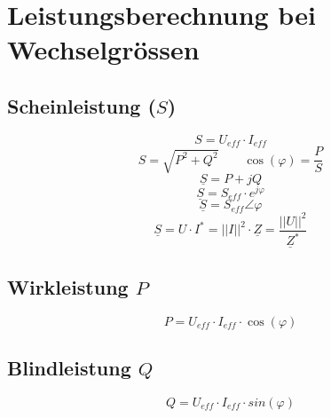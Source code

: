 



\section{Leistungsberechnung bei Wechselgrössen}

\subsection{Scheinleistung ($S$)}
\[ S = U_{eff} \cdot I_{eff} \]
\[ S = \sqrt{P^2 + Q^2} \qquad \cos(\varphi) = \frac{P}{S} \]
\[ \underline{S} = P + j Q \]
\[ \underline{S} = S_{eff} \cdot e^{j\varphi} \]
\[ \underline{S} = S_{eff} \angle \varphi \]
\[ \underline{S} = U \cdot I^* = ||I||^2 \cdot \underline{Z} 
= \frac{||U||^2}{\underline{Z}^*} \]

\subsection{Wirkleistung $P$}
\[ P = U_{eff} \cdot I_{eff} \cdot \cos(\varphi) \]

\subsection{Blindleistung $Q$}
\[ Q = U_{eff} \cdot I_{eff} \cdot sin(\varphi) \]


